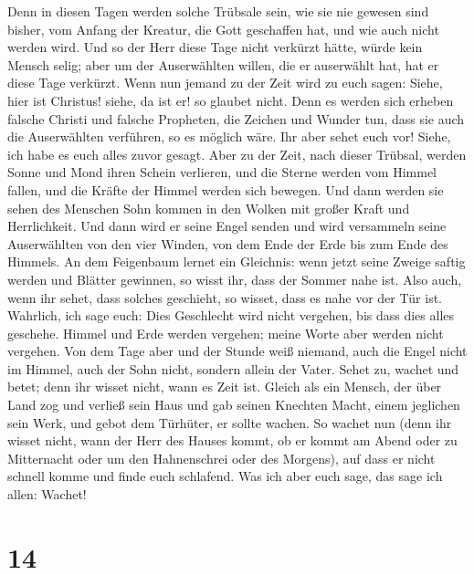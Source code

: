Denn in diesen Tagen werden solche Trübsale sein, wie sie nie gewesen
sind bisher, vom Anfang der Kreatur, die Gott geschaffen hat, und wie
auch nicht werden wird.  Und so der Herr diese Tage nicht
verkürzt hätte, würde kein Mensch selig; aber um der Auserwählten
willen, die er auserwählt hat, hat er diese Tage verkürzt.
 Wenn nun jemand zu der Zeit wird zu euch sagen: Siehe,
hier ist Christus! siehe, da ist er! so glaubet nicht. 
Denn es werden sich erheben falsche Christi und falsche Propheten, die
Zeichen und Wunder tun, dass sie auch die Auserwählten verführen, so es
möglich wäre.  Ihr aber sehet euch vor! Siehe, ich habe
es euch alles zuvor gesagt.  Aber zu der Zeit, nach
dieser Trübsal, werden Sonne und Mond ihren Schein verlieren,
 und die Sterne werden vom Himmel fallen, und die Kräfte
der Himmel werden sich bewegen.  Und dann werden sie
sehen des Menschen Sohn kommen in den Wolken mit großer Kraft und
Herrlichkeit.  Und dann wird er seine Engel senden und
wird versammeln seine Auserwählten von den vier Winden, von dem Ende der
Erde bis zum Ende des Himmels.  An dem Feigenbaum lernet
ein Gleichnis: wenn jetzt seine Zweige saftig werden und Blätter
gewinnen, so wisst ihr, dass der Sommer nahe ist.  Also
auch, wenn ihr sehet, dass solches geschieht, so wisset, dass es nahe
vor der Tür ist.  Wahrlich, ich sage euch: Dies
Geschlecht wird nicht vergehen, bis dass dies alles geschehe.
 Himmel und Erde werden vergehen; meine Worte aber werden
nicht vergehen.  Von dem Tage aber und der Stunde weiß
niemand, auch die Engel nicht im Himmel, auch der Sohn nicht, sondern
allein der Vater.  Sehet zu, wachet und betet; denn ihr
wisset nicht, wann es Zeit ist.  Gleich als ein Mensch,
der über Land zog und verließ sein Haus und gab seinen Knechten Macht,
einem jeglichen sein Werk, und gebot dem Türhüter, er sollte wachen.
 So wachet nun (denn ihr wisset nicht, wann der Herr des
Hauses kommt, ob er kommt am Abend oder zu Mitternacht oder um den
Hahnenschrei oder des Morgens),  auf dass er nicht
schnell komme und finde euch schlafend.  Was ich aber
euch sage, das sage ich allen: Wachet!

\hypertarget{section-13}{%
\section{14}\label{section-13}}


